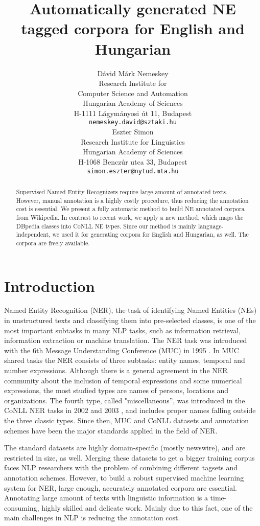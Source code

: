 \documentclass[11pt]{article}
\title{Automatically generated NE tagged corpora for English and Hungarian}
\author{Dávid Márk Nemeskey \\
  Research Institute for \\ Computer Science and Automation \\
  Hungarian Academy of Sciences \\
  H-1111 Lágymányosi út 11, Budapest \\
  {\tt nemeskey.david@sztaki.hu} \\\And
  Eszter Simon \\
  Research Institute for Linguistics \\
  Hungarian Academy of Sciences \\
  H-1068 Benczúr utca 33, Budapest \\
  {\tt simon.eszter@nytud.mta.hu} \\}
\date{}
\begin{document}
\maketitle
\begin{abstract}

Supervised Named Entity Recognizers require large amount of annotated texts. However, manual annotation is a highly costly procedure, thus reducing the annotation cost is essential. We present a fully automatic method to build NE annotated corpora from Wikipedia. In contrast to recent work, we apply a new method, which maps the DBpedia classes into CoNLL NE types. Since our method is mainly language-independent, we used it for generating corpora for English and Hungarian, as well. The corpora are freely available. 

\end{abstract}

\section{Introduction}
\label{sec:intro}

Named Entity Recognition (NER), the task of identifying Named Entities (NEs) in unstructured texts and classifying them into pre-selected classes, is one of the most important subtasks in many NLP tasks, such as information retrieval, information extraction or machine translation. The NER task was introduced with the 6th Message Understanding Conference (MUC) in 1995 \cite{Grishman:96}. In MUC shared tasks the NER consists of three subtasks: entity names, temporal and number expressions. Although there is a general agreement in the NER community about the inclusion of temporal expressions and some numerical expressions, the most studied types are names of persons, locations and organizations. The fourth type, called "miscellaneous'', was introduced in the CoNLL NER tasks in 2002 \cite{Tjong:02} and 2003 \cite{Tjong:03}, and includes proper names falling outside the three classic types. Since then, MUC and CoNLL datasets and annotation schemes have been the major standards applied in the field of NER. 

The standard datasets are highly domain-specific (mostly newswire), and are restricted in size, as well. 
Merging these datasets to get a bigger training corpus faces NLP researchers with the problem of combining different tagsets and annotation schemes. However, to build a robust supervised machine learning system for NER, large enough, accurately annotated corpora are essential. Annotating large amount of texts with linguistic information is a time-consuming, highly skilled and delicate work. Mainly due to this fact, one of the main challenges in NLP is reducing the annotation cost. 
\end{document}
